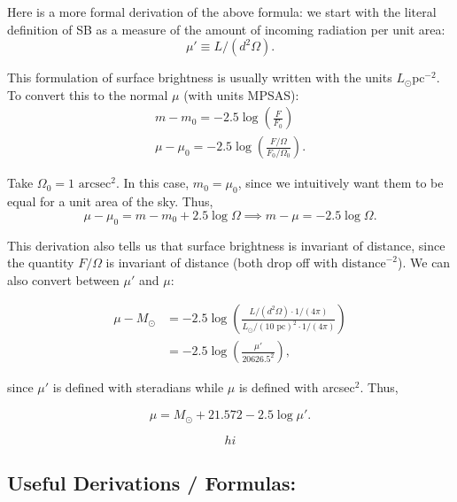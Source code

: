\documentclass[12pt]{article}
\begin{document}
Here is a more formal derivation of the above formula: we start with the literal definition of SB as a measure of the amount of incoming radiation per unit area: 
\[\mu' \equiv L/(d^2\Omega).\]

This formulation of surface brightness is usually written with the units $L_{\odot}\text{pc}^{-2}$. To convert this to the normal $\mu$ (with units MPSAS):
\begin{align*}
m - m_0 = -2.5\log{\left(\frac{F}{F_0}\right)} \\ 
\mu - \mu_0 = -2.5\log{\left(\frac{F/\Omega}{F_0/\Omega_0}\right)}.
\end{align*}

Take $\Omega_0 = 1\text{ arcsec}^{2}$. In this case, $m_0 = \mu_0$, since we intuitively want them to be equal for a unit area of the sky. Thus, 
\[\mu - \mu_0 = m - m_0 + 2.5\log{\Omega}\implies m - \mu = -2.5\log{\Omega}.\]

This derivation also tells us that surface brightness is invariant of distance, since the quantity $F/\Omega$ is invariant of distance (both drop off with $\text{distance}^{-2}$). We can also convert between $\mu'$ and $\mu$: 

\begin{align*}
\mu - M_{\odot} &= -2.5\log{\left(\frac{L/(d^2\Omega) \cdot 1/(4\pi)}{L_{\odot}/(10\text{ pc})^2\cdot 1/(4\pi)}\right)} \\
&= -2.5\log{\left(\frac{\mu'}{20626.5^2}\right)},
\end{align*}

since $\mu'$ is defined with steradians while $\mu$ is defined with arcsec$^2$. Thus,

\[\mu = M_{\odot} + 21.572 - 2.5\log{\mu'}.\]

\[hi\]

\subsection{Useful Derivations / Formulas:}
\end{document}
